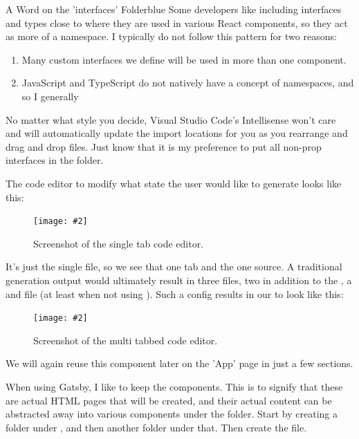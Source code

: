 \documentclass[paper=6in:9in,pagesize=pdftex,headinclude=on,footinclude=on,12pt]{scrbook}
\newcommand{\standardfigure}[3]{\begin{figure}[H]\begin{center}\texttt{[image: \#2]}\caption{#3}\label{fig:#2}\end{center}\end{figure}}
\begin{document}
\begin{highlightBox}{A Word on the 'interfaces' Folder}{blue}{\information}
Some developers like including interfaces and types close to where they are used in various React components, so they act as more of a namespace. I typically do not follow this pattern for two reasons:

\begin{enumerate}
  \item Many custom interfaces we define will be used in more than one component.
  \item JavaScript and TypeScript do not natively have a concept of namespaces, and so I generally 
\end{enumerate}

No matter what style you decide, Visual Studio Code's Intellisense won't care and will automatically update the import locations for you as you rearrange and drag and drop files. Just know that it is my preference to put all non-prop interfaces in the  folder.
\end{highlightBox}



The code editor to modify what state the user would like to generate looks like this:

\standardfigure{\textwidth}{frontend/components/single-editor}{Screenshot of the single tab code editor.}

It's just the single  file, so we see that one tab and the one source. A traditional generation output would ultimately result in three files, two in addition to the , a  and  file (at least when not using ). Such a config results in our  to look like this:

\standardfigure{\textwidth}{frontend/components/multi-editor}{Screenshot of the multi tabbed code editor.}

We will again reuse this component later on the 'App' page in just a few sections.


When using Gatsby, I like to keep the components. This is to signify that these are actual HTML pages that will be created, and their actual content can be abstracted away into various components under the  folder. Start by creating a   folder under  , and then another folder   under that. Then create the file.
\end{document}
